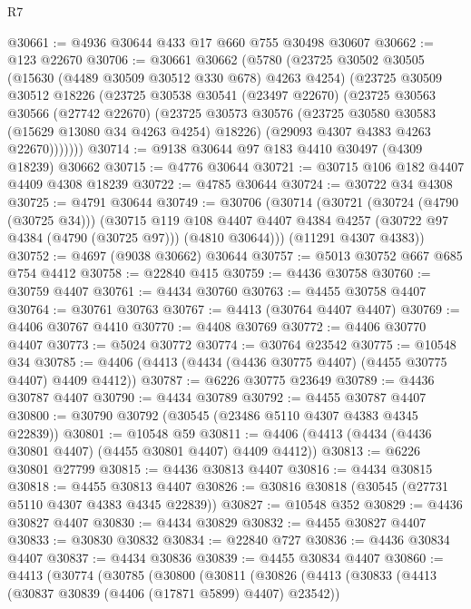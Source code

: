 \begin{lexlean}{R7}
\begin{coremodule}
@30661 := @4936 @30644 @433 @17 @660 @755 @30498 @30607
@30662 := @123 @22670
@30706 := @30661
    @30662
    (@5780
      (@23725
        @30502
        @30505
        (@15630 (@4489 @30509 @30512 @330 @678) @4263 @4254)
        (@23725
          @30509
          @30512
          @18226
          (@23725
            @30538
            @30541
            (@23497 @22670)
            (@23725
              @30563
              @30566
              (@27742 @22670)
              (@23725
                @30573
                @30576
                (@23725 @30580 @30583 (@15629 @13080 @34 @4263 @4254) @18226)
                (@29093 @4307 @4383 @4263 @22670)))))))
@30714 := @9138 @30644 @97 @183 @4410 @30497 (@4309 @18239) @30662
@30715 := @4776 @30644
@30721 := @30715 @106 @182 @4407 @4409 @4308 @18239
@30722 := @4785 @30644
@30724 := @30722 @34 @4308
@30725 := @4791 @30644
@30749 := @30706
    (@30714
      (@30721
        (@30724 (@4790 (@30725 @34)))
        (@30715
          @119
          @108
          @4407
          @4407
          @4384
          @4257
          (@30722 @97 @4384 (@4790 (@30725 @97)))
          (@4810 @30644)))
      (@11291 @4307 @4383))
@30752 := @4697 (@9038 @30662) @30644
@30757 := @5013 @30752 @667 @685 @754 @4412
@30758 := @22840 @415
@30759 := @4436 @30758
@30760 := @30759 @4407
@30761 := @4434 @30760
@30763 := @4455 @30758 @4407
@30764 := @30761 @30763
@30767 := @4413 (@30764 @4407 @4407)
@30769 := @4406 @30767 @4410
@30770 := @4408 @30769
@30772 := @4406 @30770 @4407
@30773 := @5024 @30772
@30774 := @30764 @23542
@30775 := @10548 @34
@30785 := @4406 (@4413 (@4434 (@4436 @30775 @4407) (@4455 @30775 @4407) @4409 @4412))
@30787 := @6226 @30775 @23649
@30789 := @4436 @30787 @4407
@30790 := @4434 @30789
@30792 := @4455 @30787 @4407
@30800 := @30790 @30792 (@30545 (@23486 @5110 @4307 @4383 @4345 @22839))
@30801 := @10548 @59
@30811 := @4406 (@4413 (@4434 (@4436 @30801 @4407) (@4455 @30801 @4407) @4409 @4412))
@30813 := @6226 @30801 @27799
@30815 := @4436 @30813 @4407
@30816 := @4434 @30815
@30818 := @4455 @30813 @4407
@30826 := @30816 @30818 (@30545 (@27731 @5110 @4307 @4383 @4345 @22839))
@30827 := @10548 @352
@30829 := @4436 @30827 @4407
@30830 := @4434 @30829
@30832 := @4455 @30827 @4407
@30833 := @30830 @30832
@30834 := @22840 @727
@30836 := @4436 @30834 @4407
@30837 := @4434 @30836
@30839 := @4455 @30834 @4407
@30860 := @4413
    (@30774
      (@30785
        (@30800
          (@30811
            (@30826
              (@4413
                (@30833
                  (@4413 (@30837 @30839 (@4406 (@17871 @5899) @4407) @23542))

\end{coremodule}
\end{lexlean}
